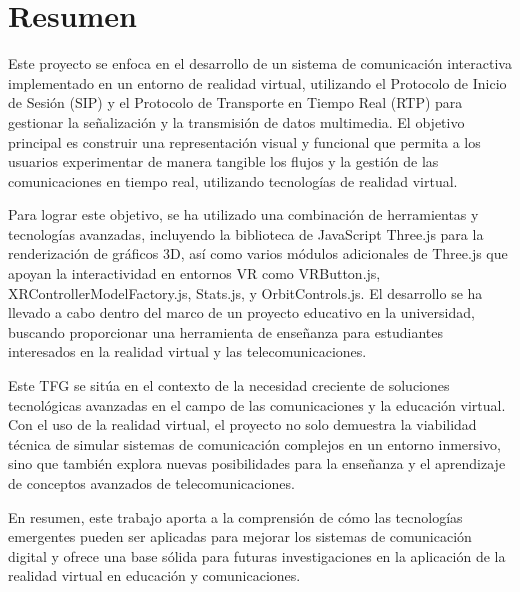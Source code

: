 \documentclass[a4paper, 12pt]{book}
\begin{document}

\chapter*{Resumen}

Este proyecto se enfoca en el desarrollo de un sistema de comunicación interactiva implementado en un entorno de realidad virtual, 
utilizando el Protocolo de Inicio de Sesión (SIP) y el Protocolo de Transporte en Tiempo Real (RTP) para gestionar la señalización y 
la transmisión de datos multimedia. El objetivo principal es construir una representación visual y funcional que permita a los usuarios 
experimentar de manera tangible los flujos y la gestión de las comunicaciones en tiempo real, utilizando tecnologías de realidad virtual.

\bigskip

Para lograr este objetivo, se ha utilizado una combinación de herramientas y tecnologías avanzadas, incluyendo la biblioteca de 
JavaScript Three.js para la renderización de gráficos 3D, así como varios módulos adicionales de Three.js que apoyan la interactividad en 
entornos VR como VRButton.js, XRControllerModelFactory.js, Stats.js, y OrbitControls.js. El desarrollo se ha llevado a cabo dentro del marco 
de un proyecto educativo en la universidad, buscando proporcionar una herramienta de enseñanza para 
estudiantes interesados en la realidad virtual y las telecomunicaciones.

\bigskip

Este TFG se sitúa en el contexto de la necesidad creciente de soluciones tecnológicas avanzadas en el campo de las comunicaciones y 
la educación virtual. Con el uso de la realidad virtual, el proyecto no solo demuestra la viabilidad técnica de simular sistemas de comunicación 
complejos en un entorno inmersivo, sino que también explora nuevas posibilidades para la enseñanza y el aprendizaje de conceptos 
avanzados de telecomunicaciones.

\bigskip

En resumen, este trabajo aporta a la comprensión de cómo las tecnologías emergentes pueden ser aplicadas para mejorar los sistemas de comunicación digital y 
ofrece una base sólida para futuras investigaciones en la aplicación de la realidad virtual en educación y comunicaciones.
\end{document}
